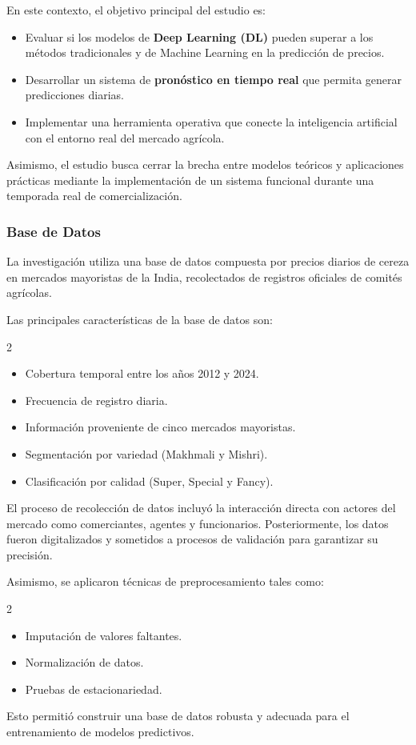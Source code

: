 En este contexto, el objetivo principal del estudio es:

\begin{itemize}
    \item Evaluar si los modelos de \textbf{Deep Learning (DL)} pueden superar a los métodos tradicionales y de Machine Learning en la predicción de precios.
    \item Desarrollar un sistema de \textbf{pronóstico en tiempo real} que permita generar predicciones diarias.
    \item Implementar una herramienta operativa que conecte la inteligencia artificial con el entorno real del mercado agrícola.
\end{itemize}

Asimismo, el estudio busca cerrar la brecha entre modelos teóricos y aplicaciones prácticas mediante la implementación de un sistema funcional durante una temporada real de comercialización.

\subsubsection{Base de Datos}

La investigación utiliza una base de datos compuesta por precios diarios de cereza en mercados mayoristas de la India, recolectados de registros oficiales de comités agrícolas.

Las principales características de la base de datos son:

\begin{multicols}{2}
\begin{itemize}
    \item Cobertura temporal entre los años 2012 y 2024.
    \item Frecuencia de registro diaria.
    \item Información proveniente de cinco mercados mayoristas.
    \item Segmentación por variedad (Makhmali y Mishri).
    \item Clasificación por calidad (Super, Special y Fancy).
\end{itemize}
\end{multicols}

El proceso de recolección de datos incluyó la interacción directa con actores del mercado como comerciantes, agentes y funcionarios. Posteriormente, los datos fueron digitalizados y sometidos a procesos de validación para garantizar su precisión.

Asimismo, se aplicaron técnicas de preprocesamiento tales como:
\begin{multicols}{2}
\begin{itemize}
    \item Imputación de valores faltantes.
    \item Normalización de datos.
    \item Pruebas de estacionariedad.
\end{itemize}
\end{multicols}
Esto permitió construir una base de datos robusta y adecuada para el entrenamiento de modelos predictivos.

